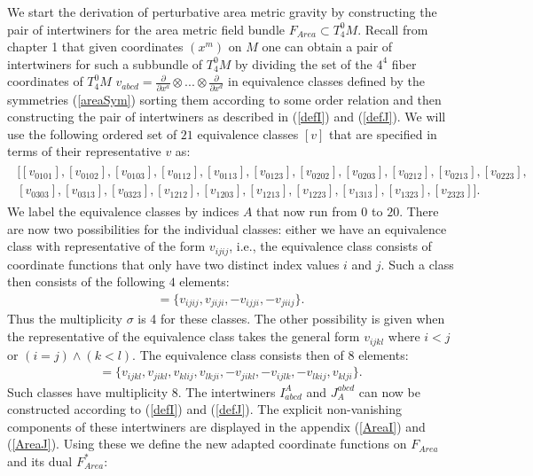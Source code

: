 We start the derivation of perturbative area metric gravity by constructing the pair of intertwiners for the area metric field bundle $F_{Area} \subset T^0_4M$. Recall from chapter 1 that given coordinates $(x^m)$ on $M$ one can obtain a pair of intertwiners for such a subbundle of $T^0_4M$ by dividing the set of the $4^4$ fiber coordinates of $T^0_4M$ $v_{abcd}=\frac{\partial}{\partial x^a} \otimes ... \otimes \frac{\partial}{\partial x^d}$ in equivalence classes defined by the symmetries (\ref{areaSym}) sorting them according to some order relation and then constructing the pair of intertwiners as described in (\ref{defI}) and (\ref{defJ}). We will use the following ordered set of $21$ equivalence classes $[v]$ that are specified in terms of their representative $v$ as:
\begin{align}
\begin{aligned}
    \bigl [ [v_{0101}], [v_{0102}], [v_{0103}], [v_{0112}], [v_{0113}], [v_{0123}], [v_{0202}], [v_{0203}], [v_{0212}], [v_{0213}], [v_{0223}],\\
     [v_{0303}], [v_{0313}], [v_{0323}], [v_{1212}], [v_{1203}], [v_{1213}], [v_{1223}], [v_{1313}], [v_{1323}], [v_{2323}]  \bigr ].
\end{aligned}
\end{align}
We label the equivalence classes by indices $A$ that now run from $0$ to $20$.
There are now two possibilities for the individual classes: either we have an equivalence class with representative of the form $v_{ijij}$, i.e., the equivalence class consists of coordinate functions that only have two distinct index values $i$ and $j$. Such a class then consists of the following $4$ elements:
\begin{align}
    [v_{ijij}] = \{ v_{ijij}, v_{jiji}, -v_{ijji}, -v_{jiij} \}.
\end{align}
Thus the multiplicity $\sigma$ is 4 for these classes.
The other possibility is given when the representative of the equivalence class takes the general form $v_{ijkl}$ where $i<j$ or $(i=j) \land (k<l)$. The equivalence class consists then of 8 elements:
\begin{align}
    [v_{ijkl}] = \{v_{ijkl},v_{jikl}, v_{klij}, v_{lkji}, -v_{jikl}, -v_{ijlk}, -v_{lkij}, v_{klji} \}.
\end{align}
Such classes have multiplicity 8. The intertwiners $I^A_{abcd}$ and $J_A^{abcd}$ can now be constructed according to (\ref{defI}) and (\ref{defJ}). The explicit non-vanishing components of these intertwiners are displayed in the appendix (\ref{AreaI}) and (\ref{AreaJ}). Using these we define the new adapted coordinate functions on $F_{Area}$ and its dual $F_{Area}^{\ast}$:
